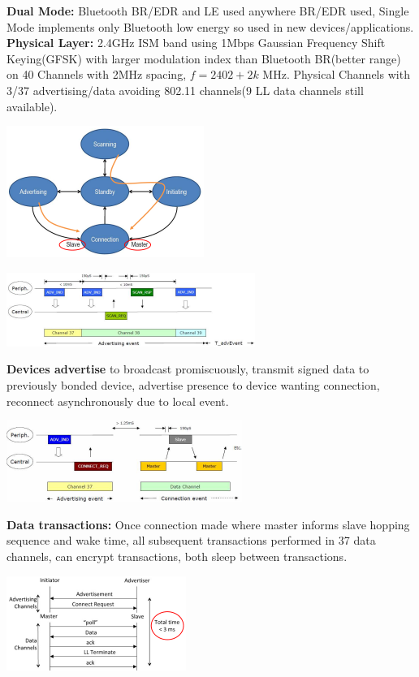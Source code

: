 \documentclass[9pt]{extarticle}
\begin{document}
\begin{multicols}{2}
\textbf{Dual Mode:} Bluetooth BR/EDR and LE used anywhere BR/EDR used, Single Mode implements only Bluetooth low energy so used in
new devices/applications. \textbf{Physical Layer:} 2.4GHz ISM band using 1Mbps Gaussian Frequency Shift Keying(GFSK) with larger modulation index than Bluetooth BR(better range) on 40 Channels with 2MHz spacing, $f=2402+2k$ MHz. Physical Channels with 3/37 advertising/data avoiding 802.11 channels(9 LL data channels still available).

\includegraphics{llstatemachine.png}

\includegraphics{advertising.png}

\textbf{Devices advertise }to broadcast promiscuously, transmit signed data to previously bonded device, advertise presence to device wanting connection, reconnect asynchronously due to local event.

\includegraphics{datatransaction.png}

\textbf{Data transactions:} Once connection made where master informs slave hopping sequence and wake time, all subsequent transactions performed in 37 data channels, can encrypt transactions, both sleep between transactions. 

\includegraphics{latency.png}


\end{multicols}
\end{document}
